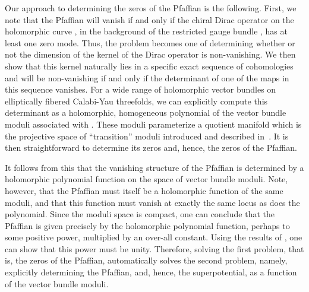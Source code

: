 \documentclass[a4paper,12pt]{article}
\numberwithin{equation}{section}
\theoremstyle{plain}
\begin{document}
Our approach to determining the zeros of the Pfaffian is the following.
First, we note that the Pfaffian will vanish if and only if the chiral
Dirac
operator on the holomorphic curve \coordHE{}, in the background of the
restricted gauge bundle \coordHE{}, has at least one zero mode. Thus,
the problem becomes one of determining whether or not the dimension of the
kernel of the Dirac operator is non-vanishing. We then show that this
kernel
naturally lies in a specific exact sequence of cohomologies and will be
non-vanishing if and only if the determinant of one of the maps in this
sequence vanishes. For a wide range of holomorphic vector bundles on
elliptically fibered Calabi-Yau threefolds, we can explicitly compute this
determinant as a holomorphic, homogeneous polynomial of the vector bundle
moduli associated with \coordHE{}.
These moduli
parameterize a quotient manifold which is the projective
space of ``transition'' moduli introduced and described in~\cite{BDOold}.
It is then straightforward to determine its zeros and,
hence, the zeros of the Pfaffian.

It follows from this that the vanishing structure of the Pfaffian is
determined by a holomorphic polynomial function on the space of vector
bundle
moduli.
Note, however, that the Pfaffian must itself be a holomorphic function of
the
same moduli, and that this function must vanish at exactly the same locus
as does
the polynomial. Since the moduli space  is compact, one can conclude that
the
Pfaffian is given precisely by the holomorphic polynomial function,
perhaps to some
positive power, multiplied by an over-all constant. Using the results of
\cite{Bismut1,Bismut2,Bismut3}, one can show that this power must be unity.
Therefore, solving the
first problem, that is, the zeros of the Pfaffian, automatically solves
the second
problem, namely, explicitly determining the Pfaffian, and, hence, the
superpotential, as a function of the vector bundle moduli.
\end{document}
